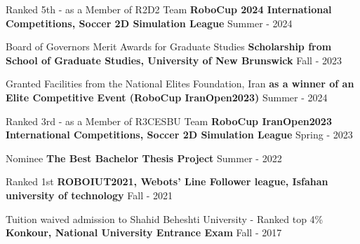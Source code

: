 \begin{cventries}
    
    \cventry
    {Ranked 5th - as a Member of R2D2 Team}
    {\textbf {RoboCup 2024 International Competitions, Soccer 2D Simulation League}}
    {}
    {Summer - 2024}
    {}
    
    
    \cventry
    {Board of Governors Merit Awards for Graduate Studies}
    {\textbf {Scholarship from School of Graduate Studies, University of New Brunswick}}
    {}
    {Fall - 2023}
    {}

    


    {Granted Facilities from the National Elites Foundation, Iran}
    {\textbf {as a winner of an Elite Competitive Event (RoboCup IranOpen2023)}}
    {}
    {Summer - 2024}
    {}


    \cventry
    {Ranked 3rd - as a Member of R3CESBU Team}
    {\textbf {RoboCup IranOpen2023 International Competitions, Soccer 2D Simulation League}}
    {}
    {Spring - 2023}
    {}

    
    \cventry
    {Nominee}
    {\textbf {The Best Bachelor Thesis Project}}
    {}
    {Summer - 2022}
    {}

    
    \cventry
    {Ranked 1st}
    {\textbf {ROBOIUT2021, Webots’ Line Follower league, Isfahan university of technology}}
    {}
    {Fall - 2021}
    {}




    \cventry
    {Tuition waived admission to Shahid Beheshti University - Ranked top 4\%}
    {\textbf {Konkour, National University Entrance Exam}}
    {}
    {Fall - 2017}
    {}
\end{cventries}